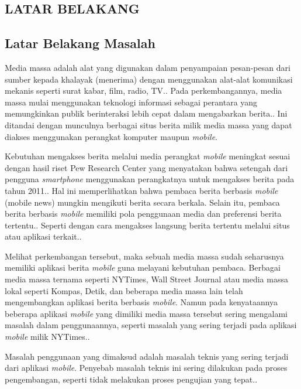\begin{spacing}{2}
\chapter{LATAR BELAKANG}

\section{Latar Belakang Masalah}
Media massa adalah alat yang digunakan dalam penyampaian pesan-pesan dari sumber kepada khalayak (menerima) dengan menggunakan alat-alat komunikasi mekanis seperti surat kabar, film, radio, TV.\cite{Hafied2005}. Pada perkembangannya, media massa mulai menggunakan teknologi informasi sebagai perantara yang memungkinkan publik berinteraksi lebih cepat dalam mengabarkan berita.\cite{maulana2016}. Ini ditandai dengan munculnya berbagai situs berita milik media massa yang dapat diakses menggunakan perangkat komputer maupun \emph{mobile}.

Kebutuhan mengakses berita melalui media perangkat \emph{mobile} meningkat sesuai dengan hasil riset Pew Research Center yang menyatakan bahwa setengah dari pengguna \emph{smartphone} menggunakan perangkatnya untuk mengakses berita pada tahun 2011.\cite{journalism2012}. Hal ini memperlihatkan bahwa pembaca berita berbasis \emph{mobile} (mobile news) mungkin mengikuti berita secara berkala. Selain itu, pembaca berita berbasis \emph{mobile} memiliki pola penggunaan media dan preferensi berita tertentu.\cite{sylvia2012}. Seperti dengan cara mengakses langsung berita tertentu melalui situs atau aplikasi terkait.\cite{journalism2012}.

Melihat perkembangan tersebut, maka sebuah media massa sudah seharusnya memiliki aplikasi berita \emph{mobile} guna melayani kebutuhan pembaca. Berbagai media massa ternama seperti NYTimes, Wall Street Journal atau media massa lokal seperti Kompas, Detik, dan beberapa media massa lain telah mengembangkan aplikasi berita berbasis \emph{mobile}. Namun pada kenyataannya beberapa aplikasi \emph{mobile} yang dimiliki media massa tersebut sering mengalami masalah dalam penggunaannya, seperti masalah yang sering terjadi pada aplikasi \emph{mobile} milik NYTimes.\cite{martin2011}.

Masalah penggunaan yang dimaksud adalah masalah teknis yang sering terjadi dari aplikasi \emph{mobile}. Penyebab masalah teknis ini sering dilakukan pada proses pengembangan, seperti tidak melakukan proses pengujian yang tepat.\cite{shiv2015}.


\end{spacing}
